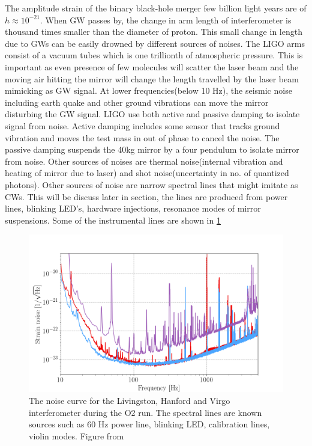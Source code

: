 \documentclass{ttuthes2007}
\begin{document}
The amplitude strain of the binary black-hole merger few billion light years are
of $h \approx10^{-21}$. When \ac{GW} passes by, the change in arm length of
interferometer is thousand times smaller than the diameter of proton. This small
change in length due to \acp{GW} can be easily drowned by different sources of
noises. The LIGO arms consist of a vacuum tubes which is one trillionth of
atmospheric pressure. This is important as even presence of few molecules will
scatter the laser beam and the moving air hitting the mirror will change the
length travelled by the laser beam mimicking as \ac{GW} signal.
 At lower frequencies(below 10 Hz), the seismic noise including earth
quake and other ground vibrations can move the mirror disturbing the \ac{GW}
signal. LIGO use both active and passive damping to isolate signal from noise.
Active damping includes some sensor that tracks ground vibration and moves the
test mass in out of phase to cancel the noise. The passive damping suspends the
40kg mirror by a four pendulum to isolate mirror from noise. Other sources of
noises are thermal noise(internal vibration and heating of mirror due to laser)
and shot noise(uncertainty in no. of quantized photons). 
Other sources of noise are narrow spectral lines that might imitate as \acp{CW}.
This will be discuss later in section{}, the lines are produced from power
lines, blinking LED's, hardware injections, resonance modes of mirror
suspensions. Some of the instrumental lines are shown in \ref{fig:CWnoise}
\begin{figure}[bht!]
	\includegraphics[width=\textwidth]{figure/CWnoise.png}
	\caption{The noise curve for the Livingston, Hanford and Virgo
interferometer during the \ac{O2} run. The spectral lines are known sources such as
60 Hz power line, blinking LED, calibration lines, violin modes. Figure from
~\cite{Abbott_2019} }
	\label{fig:CWnoise}
\end{figure}
\end{document}
